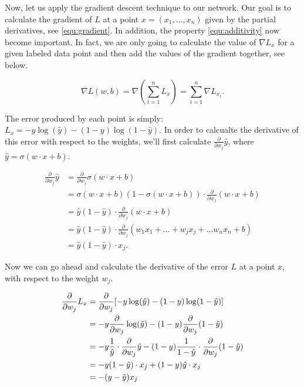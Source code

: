 Now, let us apply the gradient descent technique to our network. Our goal is to calculate the gradient of $L$ at a point $x = (x_1, \ldots, x_n)$ given by the partial derivatives, see \cref{equ:gradient}. In addition, the property \cref{equ:additivity} now become important. In fact, we are only going to calculate the value of $\nabla L_x$ for a given labeled data point and then add the values of the gradient together, see below.

\begin{equation}
  \nabla L(w, b) = \nabla (\sum_{i = 1}^{n} L_x) = \sum_{i = 1}^{n} \nabla L_{x_i}.
\end{equation}

The error produced by each point is simply: $ L_x = -y \log (\hat{y}) - (1 - y) \log (1 - \hat{y})$. In order to calcualte the derivative of this error with respect to the weights, we'll first calculate $ \frac{\partial}{\partial w_j} \hat{y}$, where $ \hat{y} = \sigma (w \cdot x + b)$.

\begin{align*}
  \frac{\partial}{\partial w_j} \hat{y} &= \frac{\partial}{\partial w_j} \sigma (w \cdot x + b) \\
     &= \sigma (w \cdot x + b) (1 - \sigma (w \cdot x + b)) \cdot \frac{\partial}{\partial w_j} (w \cdot x + b) \\
     &= \hat{y} (1 - \hat{y}) \cdot \frac{\partial}{\partial w_j} (w \cdot x + b) \\
     &= \hat{y} (1 - \hat{y}) \cdot \frac{\partial}{\partial w_j} (w_1 x_1 + \ldots + w_j x_j + \ldots w_n x_n + b) \\
     &= \hat{y} (1 - \hat{y}) \cdot x_j.
\end{align*}

Now we can go ahead and calculate the derivative of the error $L$ at a point $x$, with respect to the weight $w_j$.

\begin{align*}
  \frac{\partial}{\partial w_j} L_x &= \frac{\partial}{\partial w_j} [-y \log (\hat{y}) - (1 - y) \log (1 - \hat{y})] \\
     &= -y \frac{\partial}{\partial w_j} \log (\hat{y}) - (1 - y) \frac{\partial}{\partial w_j} (1 - \hat{y}) \\
     &= -y \frac{1}{\hat{y}} \cdot \frac{\partial}{\partial w_j} \hat{y} - (1 - y) \frac{1}{1 - \hat{y}} \cdot \frac{\partial}{\partial w_j} (1 - \hat{y}) \\
     &= -y (1 - \hat{y}) \cdot x_j + (1 - y)\hat{y} \cdot x_j \\
     &= -(y - \hat{y}) x_j
\end{align*}

